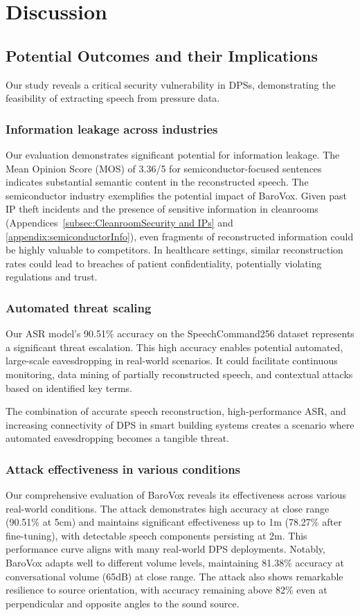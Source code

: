 \section{Discussion}

\subsection{Potential Outcomes and their Implications}
Our study reveals a critical security vulnerability in DPSs, demonstrating the feasibility of extracting speech from pressure data. 

\subsubsection{Information leakage across industries}
Our evaluation demonstrates significant potential for information leakage.
The Mean Opinion Score (MOS) of 3.36/5 for semiconductor-focused sentences indicates substantial semantic content in the reconstructed speech. 
The semiconductor industry exemplifies the potential impact of BaroVox. Given past IP theft incidents and the presence of sensitive information in cleanrooms (Appendices~\ref{subsec:CleanroomSecurity and IPs} and \ref{appendix:semiconductorInfo}), even fragments of reconstructed information could be highly valuable to competitors. In healthcare settings, similar reconstruction rates could lead to breaches of patient confidentiality, potentially violating regulations and trust.

\subsubsection{Automated threat scaling}
Our ASR model's 90.51\% accuracy on the SpeechCommand256 dataset represents a significant threat escalation. This high accuracy enables potential automated, large-scale eavesdropping in real-world scenarios. It could facilitate continuous monitoring, data mining of partially reconstructed speech, and contextual attacks based on identified key terms.

The combination of accurate speech reconstruction, high-performance ASR, and increasing connectivity of DPS in smart building systems creates a scenario where automated eavesdropping becomes a tangible threat. 

\subsubsection{Attack effectiveness in various conditions}
Our comprehensive evaluation of BaroVox reveals its effectiveness across various real-world conditions. The attack demonstrates high accuracy at close range (90.51\% at 5cm) and maintains significant effectiveness up to 1m (78.27\% after fine-tuning), with detectable speech components persisting at 2m. This performance curve aligns with many real-world DPS deployments. Notably, BaroVox adapts well to different volume levels, maintaining 81.38\% accuracy at conversational volume (65dB) at close range. The attack also shows remarkable resilience to source orientation, with accuracy remaining above 82\% even at perpendicular and opposite angles to the sound source.

